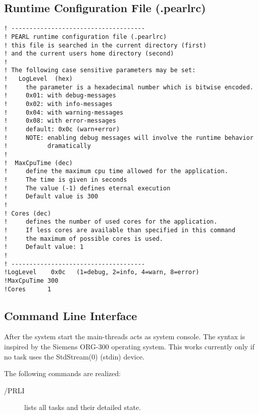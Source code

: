 \subsection{Runtime Configuration File (.pearlrc)}
\label{pearlrc}
\begin{lstlisting}
! -------------------------------------
! PEARL runtime configuration file (.pearlrc)
! this file is searched in the current directory (first)
! and the current users home directory (second)
!
! The following case sensitive parameters may be set:
!   LogLevel  (hex)
!     the parameter is a hexadecimal number which is bitwise encoded.
!     0x01: with debug-messages
!     0x02: with info-messages
!     0x04: with warning-messages
!     0x08: with error-messages
!     default: 0x0c (warn+error)
!     NOTE: enabling debug messages will involve the runtime behavior
!           dramatically
!
!  MaxCpuTime (dec)
!     define the maximum cpu time allowed for the application.
!     The time is given in seconds
!     The value (-1) defines eternal execution
!     Default value is 300
!
! Cores (dec)
!     defines the number of used cores for the application.
!     If less cores are available than specified in this command
!     the maximum of possible cores is used.
!     Default value: 1
!  
! -------------------------------------
!LogLevel    0x0c   (1=debug, 2=info, 4=warn, 8=error)
!MaxCpuTime 300
!Cores      1
\end{lstlisting}

\subsection{Command Line Interface}
After the system start the main-threads acts as system console.
The syntax is inspired by the Siemens ORG-300 operating system.
This works currently only if no task uses the StdStream(0) (stdin) device.


The following commands are realized:
\begin{description}
\item[/PRLI] lists all tasks and their detailed state.
\end{description}
